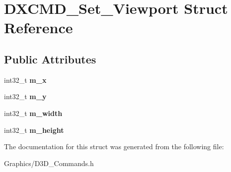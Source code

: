 \hypertarget{structDXCMD__Set__Viewport}{}\section{D\+X\+C\+M\+D\+\_\+\+Set\+\_\+\+Viewport Struct Reference}
\label{structDXCMD__Set__Viewport}
\subsection*{Public Attributes}
\begin{DoxyCompactItemize}
\item 
\mbox{\label{structDXCMD__Set__Viewport_a9659f05e31fb28cfcf7aae987d240506}} 
int32\+\_\+t {\bfseries m\+\_\+x}
\item 
\mbox{\label{structDXCMD__Set__Viewport_a2a4eebba8c886fb51cd5b78c6626a2c7}} 
int32\+\_\+t {\bfseries m\+\_\+y}
\item 
\mbox{\label{structDXCMD__Set__Viewport_a593f66e5dad2474993ee45be79510ef7}} 
int32\+\_\+t {\bfseries m\+\_\+width}
\item 
\mbox{\label{structDXCMD__Set__Viewport_acb1cef980c7837df96c3ea145f9a311b}} 
int32\+\_\+t {\bfseries m\+\_\+height}
\end{DoxyCompactItemize}


The documentation for this struct was generated from the following file\+:\begin{DoxyCompactItemize}
\item 
Graphics/D3\+D\+\_\+\+Commands.\+h\end{DoxyCompactItemize}

